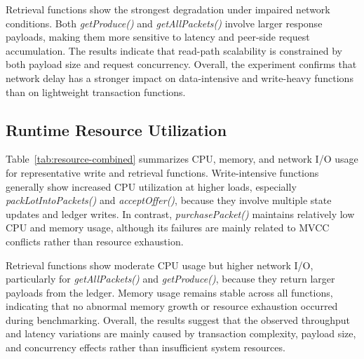 \documentclass[manuscript,screen]{acmart}
\begin{document}
Retrieval functions show the strongest degradation under impaired network conditions. Both \textit{getProduce()} and \textit{getAllPackets()} involve larger response payloads, making them more sensitive to latency and peer-side request accumulation. The results indicate that read-path scalability is constrained by both payload size and request concurrency. Overall, the experiment confirms that network delay has a stronger impact on data-intensive and write-heavy functions than on lightweight transaction functions.
\subsection{Runtime Resource Utilization}

Table~\ref{tab:resource-combined} summarizes CPU, memory, and network I/O usage for representative write and retrieval functions. Write-intensive functions generally show increased CPU utilization at higher loads, especially \textit{packLotIntoPackets()} and \textit{acceptOffer()}, because they involve multiple state updates and ledger writes. In contrast, \textit{purchasePacket()} maintains relatively low CPU and memory usage, although its failures are mainly related to MVCC conflicts rather than resource exhaustion.

Retrieval functions show moderate CPU usage but higher network I/O, particularly for \textit{getAllPackets()} and \textit{getProduce()}, because they return larger payloads from the ledger. Memory usage remains stable across all functions, indicating that no abnormal memory growth or resource exhaustion occurred during benchmarking. Overall, the results suggest that the observed throughput and latency variations are mainly caused by transaction complexity, payload size, and concurrency effects rather than insufficient system resources.
\end{document}
